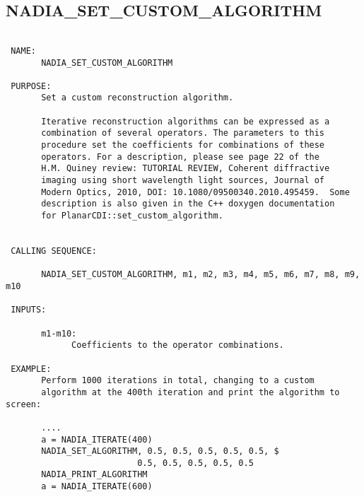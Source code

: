 \subsection{NADIA\_SET\_CUSTOM\_ALGORITHM}
\begin{verbatim}

 NAME:
       NADIA_SET_CUSTOM_ALGORITHM

 PURPOSE:
       Set a custom reconstruction algorithm.
       
       Iterative reconstruction algorithms can be expressed as a
       combination of several operators. The parameters to this
       procedure set the coefficients for combinations of these
       operators. For a description, please see page 22 of the
       H.M. Quiney review: TUTORIAL REVIEW, Coherent diffractive
       imaging using short wavelength light sources, Journal of
       Modern Optics, 2010, DOI: 10.1080/09500340.2010.495459.  Some
       description is also given in the C++ doxygen documentation
       for PlanarCDI::set_custom_algorithm.


 CALLING SEQUENCE:

       NADIA_SET_CUSTOM_ALGORITHM, m1, m2, m3, m4, m5, m6, m7, m8, m9, m10

 INPUTS:

       m1-m10:
             Coefficients to the operator combinations.

 EXAMPLE:
       Perform 1000 iterations in total, changing to a custom
       algorithm at the 400th iteration and print the algorithm to screen:

       ....
       a = NADIA_ITERATE(400)
       NADIA_SET_ALGORITHM, 0.5, 0.5, 0.5, 0.5, 0.5, $ 
                          0.5, 0.5, 0.5, 0.5, 0.5
       NADIA_PRINT_ALGORITHM                    
       a = NADIA_ITERATE(600)

\end{verbatim}






  
 
